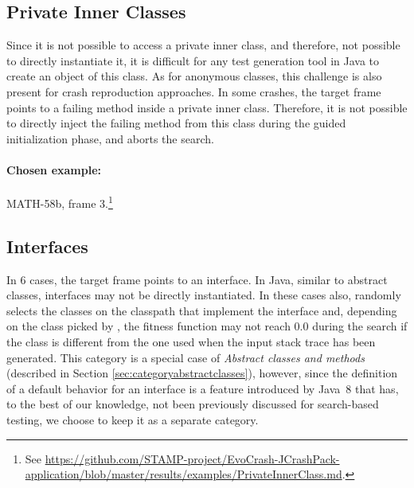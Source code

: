 \subsection{Private Inner Classes}

Since it is not possible to access a private inner class, and therefore, not possible to directly instantiate it, it is difficult for any test generation tool in Java to create an object of this class.
As for anonymous classes, this challenge is also present for crash reproduction approaches.
In some crashes, the target frame points to a failing method inside a private inner class.
Therefore, it is not possible to directly inject the failing method from this class during the guided initialization phase, and \evocrash aborts the search.

\paragraph{Chosen example:} 
MATH-58b, frame 3.\footnote{See \url{https://github.com/STAMP-project/EvoCrash-JCrashPack-application/blob/master/results/examples/PrivateInnerClass.md}.}





\subsection{Interfaces}

In 6 cases, the target frame points to an interface.
In Java, similar to abstract classes, interfaces may not be directly instantiated.
In these cases also, \evocrash randomly selects the classes on the classpath that implement the interface and, depending on the class picked by \evocrash, the fitness function may  not reach $0.0$ during the search if the class is different from the one used when the input stack trace has been generated.
%
This category is a special case of \emph{Abstract classes and methods} (described in Section \ref{sec:categoryabstractclasses}), however, since the definition of a default behavior for an interface is a feature introduced by Java~8 \cite{jdk8release} that has, to the best of our knowledge, not been previously discussed for search-based testing, we choose to keep it as a separate category. 


